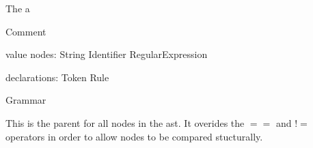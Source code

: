 The a


Comment

value nodes:
    String
    Identifier
    RegularExpression

declarations:
    Token
    Rule

Grammar







This is the parent for all nodes in the ast. It overides the $==$ and $!=$ operators in order to allow nodes to be compared stucturally. 
